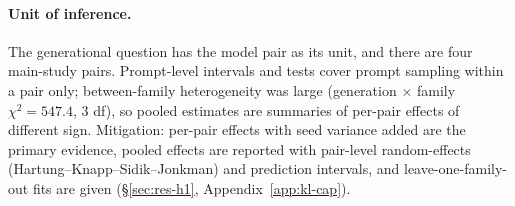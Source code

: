 \paragraph{Unit of inference.}
The generational question has the model pair as its unit, and there are four
main-study pairs. Prompt-level intervals and tests cover prompt sampling
within a pair only; between-family heterogeneity was large (generation
$\times$ family $\chi^2=547.4$, 3 df), so pooled estimates are summaries of
per-pair effects of different sign. Mitigation: per-pair effects with seed
variance added are the primary evidence, pooled effects are reported with
pair-level random-effects (Hartung--Knapp--Sidik--Jonkman) and prediction
intervals, and leave-one-family-out fits are given (\S\ref{sec:res-h1},
Appendix~\ref{app:kl-cap}).

